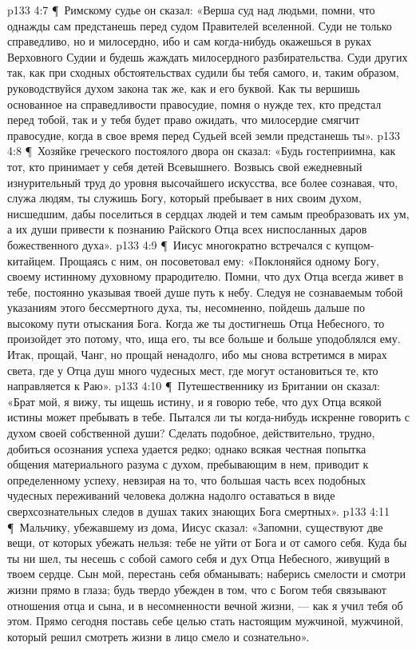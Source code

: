 \vs p133 4:7 \P\ Римскому судье он сказал: «Верша суд над людьми, помни, что однажды сам предстанешь перед судом Правителей вселенной. Суди не только справедливо, но и милосердно, ибо и сам когда\hyp{}нибудь окажешься в руках Верховного Судии и будешь жаждать милосердного разбирательства. Суди других так, как при сходных обстоятельствах судили бы тебя самого, и, таким образом, руководствуйся духом закона так же, как и его буквой. Как ты вершишь основанное на справедливости правосудие, помня о нужде тех, кто предстал перед тобой, так и у тебя будет право ожидать, что милосердие смягчит правосудие, когда в свое время перед Судьей всей земли предстанешь ты».
\vs p133 4:8 \P\ Хозяйке греческого постоялого двора он сказал: «Будь гостеприимна, как тот, кто принимает у себя детей Всевышнего. Возвысь свой ежедневный изнурительный труд до уровня высочайшего искусства, все более сознавая, что, служа людям, ты служишь Богу, который пребывает в них своим духом, нисшедшим, дабы поселиться в сердцах людей и тем самым преобразовать их ум, а их души привести к познанию Райского Отца всех ниспосланных даров божественного духа».
\vs p133 4:9 \P\ Иисус многократно встречался с купцом\hyp{}китайцем. Прощаясь с ним, он посоветовал ему: «Поклоняйся одному Богу, своему истинному духовному прародителю. Помни, что дух Отца всегда живет в тебе, постоянно указывая твоей душе путь к небу. Следуя не сознаваемым тобой указаниям этого бессмертного духа, ты, несомненно, пойдешь дальше по высокому пути отыскания Бога. Когда же ты достигнешь Отца Небесного, то произойдет это потому, что, ища его, ты все больше и больше уподоблялся ему. Итак, прощай, Чанг, но прощай ненадолго, ибо мы снова встретимся в мирах света, где у Отца душ много чудесных мест, где могут остановиться те, кто направляется к Раю».
\vs p133 4:10 \P\ Путешественнику из Британии он сказал: «Брат мой, я вижу, ты ищешь истину, и я говорю тебе, что дух Отца всякой истины может пребывать в тебе. Пытался ли ты когда\hyp{}нибудь искренне говорить с духом своей собственной души? Сделать подобное, действительно, трудно, добиться осознания успеха удается редко; однако всякая честная попытка общения материального разума с духом, пребывающим в нем, приводит к определенному успеху, невзирая на то, что большая часть всех подобных чудесных переживаний человека должна надолго оставаться в виде сверхсознательных следов в душах таких знающих Бога смертных».
\vs p133 4:11 \P\ Мальчику, убежавшему из дома, Иисус сказал: «Запомни, существуют две вещи, от которых убежать нельзя: тебе не уйти от Бога и от самого себя. Куда бы ты ни шел, ты несешь с собой самого себя и дух Отца Небесного, живущий в твоем сердце. Сын мой, перестань себя обманывать; наберись смелости и смотри жизни прямо в глаза; будь твердо убежден в том, что с Богом тебя связывают отношения отца и сына, и в несомненности вечной жизни, --- как я учил тебя об этом. Прямо сегодня поставь себе целью стать настоящим мужчиной, мужчиной, который решил смотреть жизни в лицо смело и сознательно».
